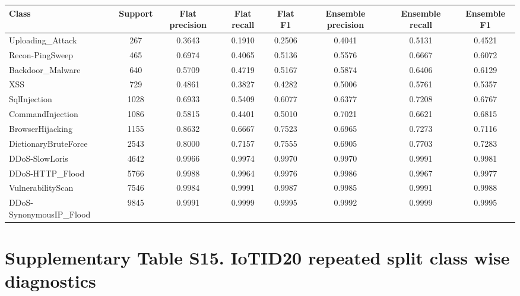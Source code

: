 \documentclass[10pt]{article}
\begin{document}
\begin{center}
\tiny
\setlength{\tabcolsep}{2pt}
\begin{longtable}{p{3.0cm}ccccccc}
\toprule
Class & Support & Flat precision & Flat recall & Flat F1 & Ensemble precision & Ensemble recall & Ensemble F1 \\
\midrule
\endhead
Uploading\_Attack & 267 & 0.3643 & 0.1910 & 0.2506 & 0.4041 & 0.5131 & 0.4521 \\
Recon-PingSweep & 465 & 0.6974 & 0.4065 & 0.5136 & 0.5576 & 0.6667 & 0.6072 \\
Backdoor\_Malware & 640 & 0.5709 & 0.4719 & 0.5167 & 0.5874 & 0.6406 & 0.6129 \\
XSS & 729 & 0.4861 & 0.3827 & 0.4282 & 0.5006 & 0.5761 & 0.5357 \\
SqlInjection & 1028 & 0.6933 & 0.5409 & 0.6077 & 0.6377 & 0.7208 & 0.6767 \\
CommandInjection & 1086 & 0.5815 & 0.4401 & 0.5010 & 0.7021 & 0.6621 & 0.6815 \\
BrowserHijacking & 1155 & 0.8632 & 0.6667 & 0.7523 & 0.6965 & 0.7273 & 0.7116 \\
DictionaryBruteForce & 2543 & 0.8000 & 0.7157 & 0.7555 & 0.6905 & 0.7703 & 0.7283 \\
DDoS-SlowLoris & 4642 & 0.9966 & 0.9974 & 0.9970 & 0.9970 & 0.9991 & 0.9981 \\
DDoS-HTTP\_Flood & 5766 & 0.9988 & 0.9964 & 0.9976 & 0.9986 & 0.9967 & 0.9977 \\
VulnerabilityScan & 7546 & 0.9984 & 0.9991 & 0.9987 & 0.9985 & 0.9991 & 0.9988 \\
DDoS-SynonymousIP\_Flood & 9845 & 0.9991 & 0.9999 & 0.9995 & 0.9992 & 0.9999 & 0.9995 \\
\bottomrule
\end{longtable}
\end{center}

\section*{Supplementary Table S15. IoTID20 repeated split class wise diagnostics}
\end{document}

